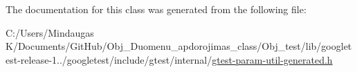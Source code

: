 The documentation for this class was generated from the following file\+:\begin{DoxyCompactItemize}
\item 
C\+:/\+Users/\+Mindaugas K/\+Documents/\+Git\+Hub/\+Obj\+\_\+\+Duomenu\+\_\+apdorojimas\+\_\+class/\+Obj\+\_\+test/lib/googletest-\/release-\/1../googletest/include/gtest/internal/\mbox{\hyperlink{gtest-param-util-generated_8h}{gtest-\/param-\/util-\/generated.\+h}}\end{DoxyCompactItemize}
